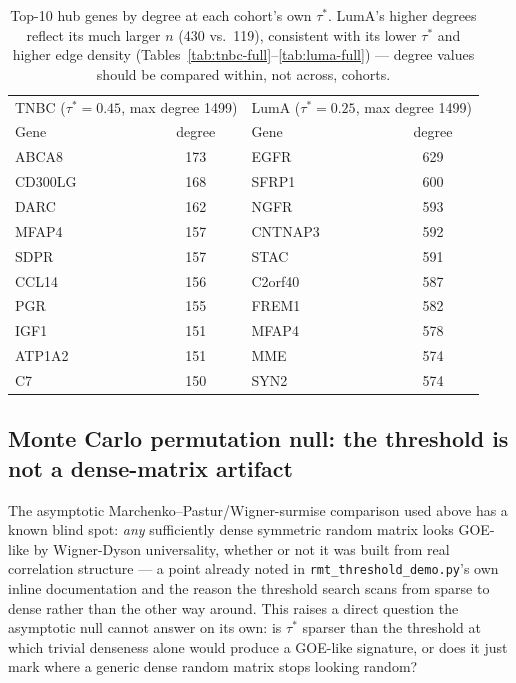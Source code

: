 \documentclass[11pt]{article}
\begin{document}
\begin{table}[h]
\centering
\caption{Top-10 hub genes by degree at each cohort's own $\tau^*$.
LumA's higher degrees reflect its much larger $n$ (430 vs.\ 119),
consistent with its lower $\tau^*$ and higher edge density
(Tables~\ref{tab:tnbc-full}--\ref{tab:luma-full}) --- degree values
should be compared within, not across, cohorts.}
\label{tab:hubs}
\begin{tabular}{lc|lc}
\toprule
\multicolumn{2}{c|}{TNBC ($\tau^*=0.45$, max degree 1499)} & \multicolumn{2}{c}{LumA ($\tau^*=0.25$, max degree 1499)} \\
Gene & degree & Gene & degree \\
\midrule
ABCA8   & 173 & EGFR    & 629 \\
CD300LG & 168 & SFRP1   & 600 \\
DARC    & 162 & NGFR    & 593 \\
MFAP4   & 157 & CNTNAP3 & 592 \\
SDPR    & 157 & STAC    & 591 \\
CCL14   & 156 & C2orf40 & 587 \\
PGR     & 155 & FREM1   & 582 \\
IGF1    & 151 & MFAP4   & 578 \\
ATP1A2  & 151 & MME     & 574 \\
C7      & 150 & SYN2    & 574 \\
\bottomrule
\end{tabular}
\end{table}

\subsection{Monte Carlo permutation null: the threshold is not a dense-matrix artifact}
\label{sec:montecarlo}

The asymptotic Marchenko--Pastur/Wigner-surmise comparison used above
has a known blind spot: \emph{any} sufficiently dense symmetric random
matrix looks GOE-like by Wigner-Dyson universality, whether or not it
was built from real correlation structure --- a point already noted in
\texttt{rmt\_threshold\_demo.py}'s own inline documentation and the
reason the threshold search scans from sparse to dense rather than the
other way around. This raises a direct question the asymptotic null
cannot answer on its own: is $\tau^*$ sparser than the threshold at
which trivial denseness alone would produce a GOE-like signature, or
does it just mark where a generic dense random matrix stops looking
random?
\end{document}
